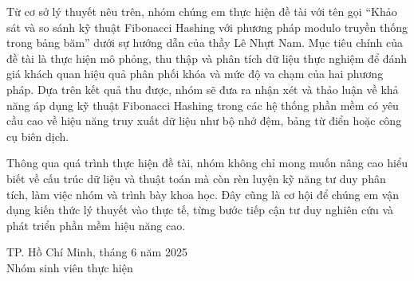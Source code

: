 \documentclass[12pt,a4paper]{report}
\begin{document}
Từ cơ sở lý thuyết nêu trên, nhóm chúng em thực hiện đề tài với tên gọi “Khảo sát và so sánh kỹ thuật Fibonacci Hashing với phương pháp modulo truyền thống trong bảng băm” dưới sự hướng dẫn của thầy Lê Nhựt Nam. Mục tiêu chính của đề tài là thực hiện mô phỏng, thu thập và phân tích dữ liệu thực nghiệm để đánh giá khách quan hiệu quả phân phối khóa và mức độ va chạm của hai phương pháp. Dựa trên kết quả thu được, nhóm sẽ đưa ra nhận xét và thảo luận về khả năng áp dụng kỹ thuật Fibonacci Hashing trong các hệ thống phần mềm có yêu cầu cao về hiệu năng truy xuất dữ liệu như bộ nhớ đệm, bảng từ điển hoặc công cụ biên dịch.

Thông qua quá trình thực hiện đề tài, nhóm không chỉ mong muốn nâng cao hiểu biết về cấu trúc dữ liệu và thuật toán mà còn rèn luyện kỹ năng tư duy phân tích, làm việc nhóm và trình bày khoa học. Đây cũng là cơ hội để chúng em vận dụng kiến thức lý thuyết vào thực tế, từng bước tiếp cận tư duy nghiên cứu và phát triển phần mềm hiệu năng cao.

\vspace{2em}

\begin{flushright}
TP. Hồ Chí Minh, tháng 6 năm 2025\\
Nhóm sinh viên thực hiện
\end{flushright}




\renewcommand{\contentsname}{}        %
\renewcommand{\listtablename}{}       %
\renewcommand{\listfigurename}{}      %

\chapter*{}
\tableofcontents

\newpage
\chapter*{}
\vspace*{-7em}
\listoftables

\newpage
\chapter*{}
\vspace*{-7em}
\listoffigures
\end{document}
